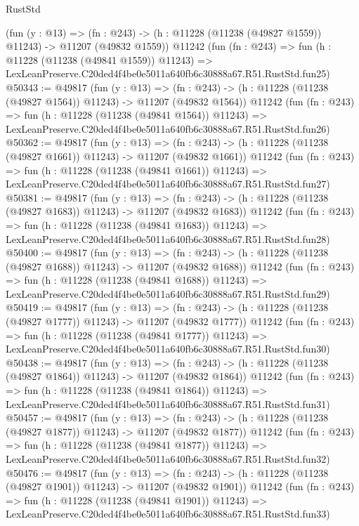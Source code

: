 \begin{lexlean}{RustStd}
\begin{coremodule}
    (fun (y : @13) =>
    (fn : @243) -> (h : @11228 (@11238 (@49827 @1559)) @11243) -> @11207 (@49832 @1559))
    @11242
    (fun (fn : @243) =>
    fun (h : @11228 (@11238 (@49841 @1559)) @11243) =>
    LexLeanPreserve.C20ded4f4be0e5011a640fb6c30888a67.R51.RustStd.fun25)
@50343 := @49817
    (fun (y : @13) =>
    (fn : @243) -> (h : @11228 (@11238 (@49827 @1564)) @11243) -> @11207 (@49832 @1564))
    @11242
    (fun (fn : @243) =>
    fun (h : @11228 (@11238 (@49841 @1564)) @11243) =>
    LexLeanPreserve.C20ded4f4be0e5011a640fb6c30888a67.R51.RustStd.fun26)
@50362 := @49817
    (fun (y : @13) =>
    (fn : @243) -> (h : @11228 (@11238 (@49827 @1661)) @11243) -> @11207 (@49832 @1661))
    @11242
    (fun (fn : @243) =>
    fun (h : @11228 (@11238 (@49841 @1661)) @11243) =>
    LexLeanPreserve.C20ded4f4be0e5011a640fb6c30888a67.R51.RustStd.fun27)
@50381 := @49817
    (fun (y : @13) =>
    (fn : @243) -> (h : @11228 (@11238 (@49827 @1683)) @11243) -> @11207 (@49832 @1683))
    @11242
    (fun (fn : @243) =>
    fun (h : @11228 (@11238 (@49841 @1683)) @11243) =>
    LexLeanPreserve.C20ded4f4be0e5011a640fb6c30888a67.R51.RustStd.fun28)
@50400 := @49817
    (fun (y : @13) =>
    (fn : @243) -> (h : @11228 (@11238 (@49827 @1688)) @11243) -> @11207 (@49832 @1688))
    @11242
    (fun (fn : @243) =>
    fun (h : @11228 (@11238 (@49841 @1688)) @11243) =>
    LexLeanPreserve.C20ded4f4be0e5011a640fb6c30888a67.R51.RustStd.fun29)
@50419 := @49817
    (fun (y : @13) =>
    (fn : @243) -> (h : @11228 (@11238 (@49827 @1777)) @11243) -> @11207 (@49832 @1777))
    @11242
    (fun (fn : @243) =>
    fun (h : @11228 (@11238 (@49841 @1777)) @11243) =>
    LexLeanPreserve.C20ded4f4be0e5011a640fb6c30888a67.R51.RustStd.fun30)
@50438 := @49817
    (fun (y : @13) =>
    (fn : @243) -> (h : @11228 (@11238 (@49827 @1864)) @11243) -> @11207 (@49832 @1864))
    @11242
    (fun (fn : @243) =>
    fun (h : @11228 (@11238 (@49841 @1864)) @11243) =>
    LexLeanPreserve.C20ded4f4be0e5011a640fb6c30888a67.R51.RustStd.fun31)
@50457 := @49817
    (fun (y : @13) =>
    (fn : @243) -> (h : @11228 (@11238 (@49827 @1877)) @11243) -> @11207 (@49832 @1877))
    @11242
    (fun (fn : @243) =>
    fun (h : @11228 (@11238 (@49841 @1877)) @11243) =>
    LexLeanPreserve.C20ded4f4be0e5011a640fb6c30888a67.R51.RustStd.fun32)
@50476 := @49817
    (fun (y : @13) =>
    (fn : @243) -> (h : @11228 (@11238 (@49827 @1901)) @11243) -> @11207 (@49832 @1901))
    @11242
    (fun (fn : @243) =>
    fun (h : @11228 (@11238 (@49841 @1901)) @11243) =>
    LexLeanPreserve.C20ded4f4be0e5011a640fb6c30888a67.R51.RustStd.fun33)

\end{coremodule}
\end{lexlean}
